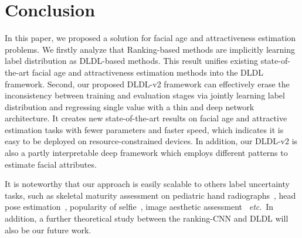 \documentclass[5p,times,twocolumn]{elsarticle}
\makeatletter
\DeclareRobustCommand\onedot{\@onedot}
\def\@onedot{.}
\def\etc{\emph{etc}\onedot}
\makeatother
\begin{document}
\section{Conclusion}\label{sec:co}
In this paper, we proposed a solution for facial age and attractiveness estimation problems. We firstly analyze that Ranking-based methods are implicitly learning label distribution as DLDL-based methods. This result unifies existing state-of-the-art facial age and attractiveness estimation methods into the DLDL framework. Second, our proposed DLDL-v2 framework can effectively erase the inconsistency between training and evaluation stages via jointly learning label distribution and regressing single value with a thin and deep network architecture. It creates new state-of-the-art results on facial age and attractive estimation tasks with fewer parameters and faster speed, which indicates it is easy to be deployed on resource-constrained devices. In addition, our DLDL-v2 is also a partly interpretable deep framework which employs different patterns to estimate facial attributes.

It is noteworthy that our approach is easily scalable to others label uncertainty tasks, such as skeletal maturity assessment on pediatric hand radiographs~\cite{larson2017performance}, head pose estimation~\cite{schwarz2017driveahead}, popularity of selfie~\cite{kalayeh2015selfie}, image aesthetic assessment~\cite{deng2017image} \etc  ~In addition, a further theoretical study between the ranking-CNN and DLDL will also be our future work.


\end{document}
